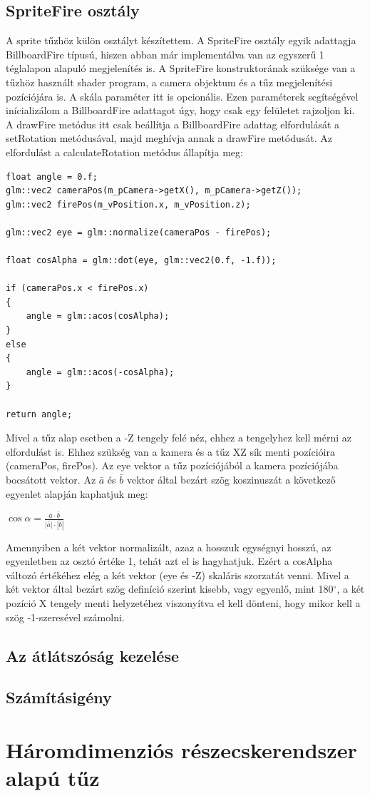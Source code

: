 \subsection{SpriteFire osztály}
A sprite tűzhöz külön osztályt készítettem. A SpriteFire osztály egyik adattagja BillboardFire típusú, hiszen abban már implementálva van az egyszerű 1 téglalapon alapuló megjelenítés is. A SpriteFire konstruktorának szüksége van a tűzhöz használt shader program, a camera objektum és a tűz megjelenítési pozíciójára is. A skála paraméter itt is opcionális. Ezen paraméterek segítségével inícializálom a BillboardFire adattagot úgy, hogy csak egy felületet rajzoljon ki. A drawFire metódus itt csak beállítja a BillboardFire adattag elfordulását a setRotation metódusával, majd meghívja annak a drawFire metódusát. Az elfordulást a calculateRotation metódus állapítja meg:
\begin{lstlisting}
float angle = 0.f;
glm::vec2 cameraPos(m_pCamera->getX(), m_pCamera->getZ());
glm::vec2 firePos(m_vPosition.x, m_vPosition.z);

glm::vec2 eye = glm::normalize(cameraPos - firePos);

float cosAlpha = glm::dot(eye, glm::vec2(0.f, -1.f)); 

if (cameraPos.x < firePos.x)
{
	angle = glm::acos(cosAlpha);
}
else
{
	angle = glm::acos(-cosAlpha);
}

return angle;
\end{lstlisting}
Mivel a tűz alap esetben a -Z tengely felé néz, ehhez a tengelyhez kell mérni az elfordulást is. Ehhez szükség van a kamera és a tűz XZ sík menti pozícióira (cameraPos, firePos). Az eye vektor a tűz pozíciójából a kamera pozíciójába bocsátott vektor. Az $\bar{a}$ és $\bar{b}$ vektor által bezárt szög koszinuszát a következő egyenlet alapján kaphatjuk meg: 
\begin{center}
$\cos \alpha = \frac{\bar{a} \cdot \bar{b}}{|\bar{a}| \cdot |\bar{b}|}$
\end{center}
Amennyiben a két vektor normalizált, azaz a hosszuk egységnyi hosszú, az egyenletben az osztó értéke 1, tehát azt el is hagyhatjuk. Ezért a cosAlpha változó értékéhez elég a két vektor (eye és -Z) skaláris szorzatát venni. Mivel a két vektor által bezárt szög definíció szerint kisebb, vagy egyenlő, mint 180$^{\circ}$, a két pozíció X tengely menti helyzetéhez viszonyítva el kell dönteni, hogy mikor kell a szög -1-szeresével számolni. 

\subsection{Az átlátszóság kezelése}

\subsection{Számításigény}


\section{Háromdimenziós részecskerendszer alapú tűz}
















